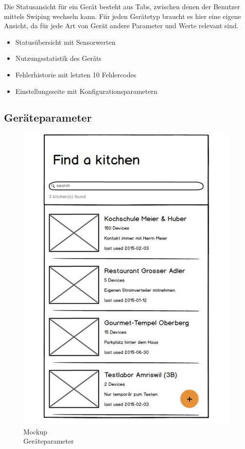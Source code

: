 Die Statusansicht für ein Gerät besteht aus Tabs, zwischen denen der Benutzer mittels Swiping wechseln kann. Für jeden Gerätetyp braucht es hier eine eigene Ansicht, da für jede Art von Gerät andere Parameter und Werte relevant sind.

\begin{itemize}
  \item Statusübersicht mit Sensorwerten
  \item Nutzungsstatistik des Geräts
  \item Fehlerhistorie mit letzten 10 Fehlercodes
  \item Einstellungsseite mit Konfigurationsparametern
\end{itemize}

\vspace{6cm}
\WFclear

\subsection{Geräteparameter}
\label{subsec:Geräteparameter}

\begin{figure}
	\begin{center}
		\vspace{-1cm}
		\includegraphics[page=6,trim=0 0 0 0,clip,scale=0.21]{uiux/res/mockups}
		\caption{Mockup\\Geräteparameter}
		\label{abb:mockDeviceParams}
	\end{center}
\end{figure}

